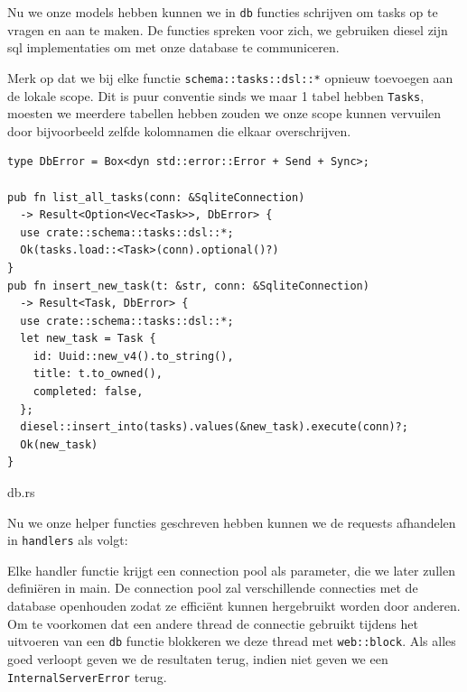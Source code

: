 Nu we onze models hebben kunnen we in \texttt{db} functies schrijven om tasks op te vragen
en aan te maken. De functies spreken voor zich, we gebruiken diesel zijn sql implementaties om met
onze database te communiceren.

Merk op dat we bij elke functie \texttt{schema::tasks::dsl::*} opnieuw toevoegen aan de
lokale scope. Dit is puur conventie sinds we maar 1 tabel hebben \texttt{Tasks}, moesten
we meerdere tabellen hebben zouden we onze scope kunnen vervuilen door bijvoorbeeld zelfde
kolomnamen die elkaar overschrijven.

\begin{listing}[h]
\begin{verbatim}
type DbError = Box<dyn std::error::Error + Send + Sync>;

pub fn list_all_tasks(conn: &SqliteConnection) 
  -> Result<Option<Vec<Task>>, DbError> {
  use crate::schema::tasks::dsl::*;
  Ok(tasks.load::<Task>(conn).optional()?)
}
pub fn insert_new_task(t: &str, conn: &SqliteConnection) 
  -> Result<Task, DbError> {
  use crate::schema::tasks::dsl::*;
  let new_task = Task {
    id: Uuid::new_v4().to_string(),
    title: t.to_owned(),
    completed: false,
  };
  diesel::insert_into(tasks).values(&new_task).execute(conn)?;
  Ok(new_task)
}
\end{verbatim}
\caption{db.rs}
\end{listing}

\clearpage

Nu we onze helper functies geschreven hebben kunnen we de requests afhandelen in
\texttt{handlers} als volgt:

Elke handler functie krijgt een connection pool als parameter, die we later zullen definiëren in
main. De connection pool zal verschillende connecties met de database openhouden zodat ze efficiënt
kunnen hergebruikt worden door anderen. Om te voorkomen dat een andere thread de connectie gebruikt
tijdens het uitvoeren van een \texttt{db} functie blokkeren we deze thread met
\texttt{web::block}. Als alles goed verloopt geven we de resultaten terug, indien niet
geven we een \texttt{InternalServerError} terug.

